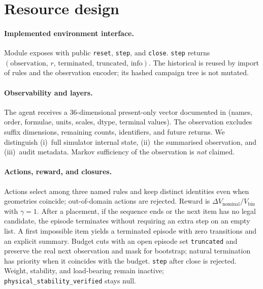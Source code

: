 \section{Resource design}

\paragraph{Implemented environment interface.}
Module  exposes
 with public \texttt{reset}, \texttt{step}, and
\texttt{close}. \texttt{step} returns
\((\mathrm{observation},\, r,\, \mathrm{terminated},\, \mathrm{truncated},\, \mathrm{info})\).
The historical  is reused by import of rules and the
observation encoder; its hashed campaign tree is not mutated.

\paragraph{Observability and layers.}
The agent receives a 36-dimensional present-only vector documented in
 (names, order, formulae, units, scales, dtype,
terminal values). The observation excludes suffix dimensions, remaining counts,
identifiers, and future returns. We distinguish (i)~full simulator internal
state, (ii)~the summarised observation, and (iii)~audit metadata. Markov
sufficiency of the observation is \emph{not} claimed.

\paragraph{Actions, reward, and closures.}
Actions select among three named rules and keep distinct identities even when
geometries coincide; out-of-domain actions are rejected. Reward is
\(\Delta V_{\mathrm{nominal}}/V_{\mathrm{bin}}\) with \(\gamma=1\). After a
placement, if the sequence ends or the next item has no legal candidate, the
episode terminates without requiring an extra step on an empty list. A first
impossible item yields a terminated episode with zero transitions and an
explicit summary. Budget cuts with an open episode set \texttt{truncated} and
preserve the real next observation and mask for bootstrap; natural termination
has priority when it coincides with the budget. \texttt{step} after close is
rejected. Weight, stability, and load-bearing remain inactive;
\texttt{physical\_stability\_verified} stays null.

